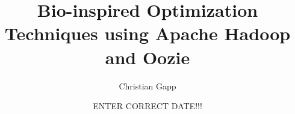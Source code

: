 \title
{Bio-inspired Optimization Techniques using Apache Hadoop and Oozie}
\author{Christian Gapp}
\date[KPT 2004] %
{ENTER CORRECT DATE!!!}